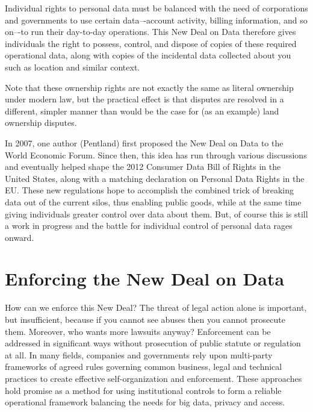 Individual rights to personal data must be balanced with the need of corporations and governments to use certain data–-account activity, billing information, and so on–-to run their day-to-day operations.
This New Deal on Data therefore gives individuals the right to possess, control, and dispose of copies of these required operational data, along with copies of the incidental data collected about you such as location and similar context.

Note that these ownership rights are not exactly the same as literal ownership under modern law, but the practical effect is that disputes are resolved in a different, simpler manner than would be the case for (as an example) land ownership disputes.

In 2007, one author (Pentland) first proposed the New Deal on Data to the World Economic Forum. 
Since then, this idea has run through various discussions and eventually helped shape the 2012 Consumer Data Bill of Rights in the United States, along with a matching declaration on Personal Data Rights in the EU.
These new regulations hope to accomplish the combined trick of breaking data out of the current silos, thus enabling public goods, while at the same time giving individuals greater control over data about them.
But, of course this is still a work in progress and the battle for individual control of personal data rages onward.

\section{Enforcing the New Deal on Data}

How can we enforce this New Deal?
The threat of legal action alone is important, but insufficient, because if you cannot see abuses then you cannot prosecute them.
Moreover, who wants more lawsuits anyway?
Enforcement can be addressed in significant ways without prosecution of public statute or regulation at all.
In many fields, companies and governments rely upon multi-party frameworks of agreed rules governing common business, legal and technical practices to create effective self-organization and enforcement.
These approaches hold promise as a method for using institutional controls to form a reliable operational framework balancing the needs for big data, privacy and access.

